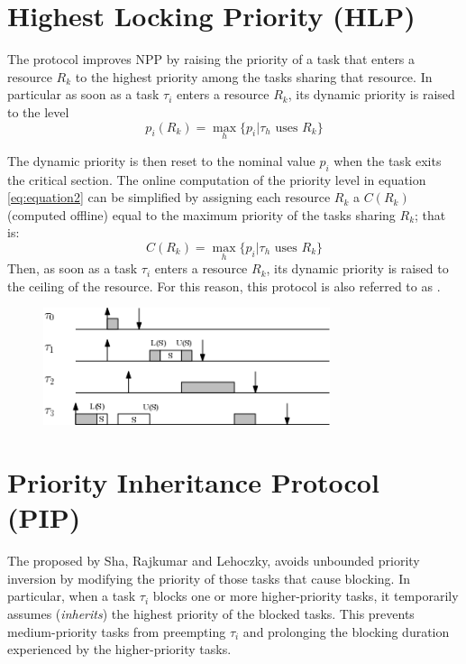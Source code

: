 \section{Highest Locking Priority (HLP)}
The  protocol improves NPP by raising the priority of a task that enters a resource $R_k$ to the highest priority among the tasks sharing that resource. In particular as soon as a task $\tau_i$ enters a resource $R_k$, its dynamic priority is raised to the level
\begin{equation}
\label{eq:equation2}
p_i(R_k) = \max_h\{p_i | \tau_h \text{ uses } R_k\}
\end{equation}

The dynamic priority is then reset to the nominal value $p_i$ when the task exits the critical section. The online computation of the priority level in equation \ref{eq:equation2} can be simplified by assigning each resource $R_k$ a  $C(R_k)$ (computed offline) equal to the maximum priority of the tasks sharing $R_k$; that is:
\[C(R_k) = \max_h\{p_i | \tau_h \text{ uses } R_k\}\]
Then, as soon as a task $\tau_i$ enters a resource $R_k$, its dynamic priority is raised to the ceiling of the resource. For this reason, this protocol is also referred to as .

\begin{figure}[!h]
    \centering
    \includegraphics[width =0.75\textwidth]{images/image08.png}
\end{figure}

\section{Priority Inheritance Protocol (PIP)}
The  proposed by Sha, Rajkumar and Lehoczky, avoids unbounded priority inversion by modifying the priority of those tasks that cause blocking. In particular, when a task $\tau_i$ blocks one or more higher-priority tasks, it temporarily assumes (\textit{inherits}) the highest priority of the blocked tasks. This prevents medium-priority tasks from preempting $\tau_i$ and prolonging the blocking duration experienced by the higher-priority tasks.

